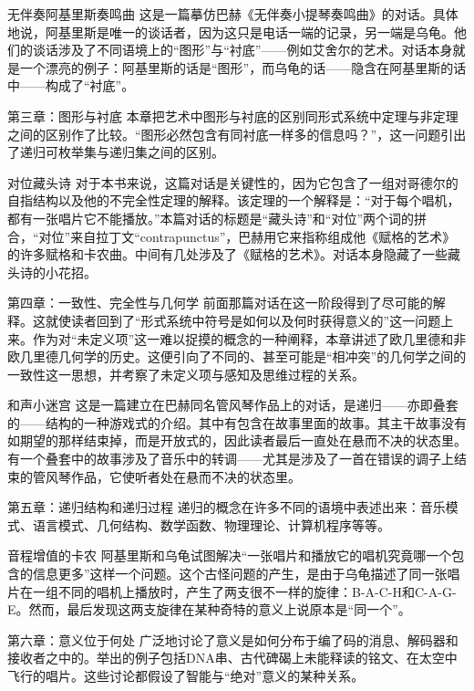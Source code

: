 \begin{overview}
\item[无伴奏阿基里斯奏鸣曲]这是一篇摹仿巴赫《无伴奏小提琴奏鸣曲》的对话。具体地说，阿基里斯是唯一的谈话者，因为这只是电话一端的记录，另一端是乌龟。他们的谈话涉及了不同语境上的“图形”与“衬底”——例如艾舍尔的艺术。对话本身就是一个漂亮的例子：阿基里斯的话是“图形”，而乌龟的话——隐含在阿基里斯的话中——构成了“衬底”。

\item[第三章：图形与衬底]本章把艺术中图形与衬底的区别同形式系统中定理与非定理之间的区别作了比较。“图形必然包含有同衬底一样多的信息吗？”，这一问题引出了递归可枚举集与递归集之间的区别。

\item[对位藏头诗]对于本书来说，这篇对话是关键性的，因为它包含了一组对哥德尔的自指结构以及他的不完全性定理的解释。该定理的一个解释是：“对于每个唱机，都有一张唱片它不能播放。”本篇对话的标题是“藏头诗”和“对位”两个词的拼合，“对位”来自拉丁文“contrapunctus”，巴赫用它来指称组成他《赋格的艺术》的许多赋格和卡农曲。中间有几处涉及了《赋格的艺术》。对话本身隐藏了一些藏头诗的小花招。

\item[第四章：一致性、完全性与几何学]前面那篇对话在这一阶段得到了尽可能的解释。这就使读者回到了“形式系统中符号是如何以及何时获得意义的”这一问题上来。作为对“未定义项”这一难以捉摸的概念的一种阐释，本章讲述了欧几里德和非欧几里德几何学的历史。这便引向了不同的、甚至可能是“相冲突”的几何学之间的一致性这一思想，并考察了未定义项与感知及思维过程的关系。

\item[和声小迷宫]这是一篇建立在巴赫同名管风琴作品上的对话，是递归——亦即叠套的——结构的一种游戏式的介绍。其中有包含在故事里面的故事。其主干故事没有如期望的那样结束掉，而是开放式的，因此读者最后一直处在悬而不决的状态里。有一个叠套中的故事涉及了音乐中的转调——尤其是涉及了一首在错误的调子上结束的管风琴作品，它使听者处在悬而不决的状态里。

\item[第五章：递归结构和递归过程]递归的概念在许多不同的语境中表述出来：音乐模式、语言模式、几何结构、数学函数、物理理论、计算机程序等等。

\item[音程增值的卡农]阿基里斯和乌龟试图解决“一张唱片和播放它的唱机究竟哪一个包含的信息更多”这样一个问题。这个古怪问题的产生，是由于乌龟描述了同一张唱片在一组不同的唱机上播放时，产生了两支很不一样的旋律：B-A-C-H和C-A-G-E。然而，最后发现这两支旋律在某种奇特的意义上说原本是“同一个”。

\item[第六章：意义位于何处]广泛地讨论了意义是如何分布于编了码的消息、解码器和接收者之中的。举出的例子包括DNA串、古代碑碣上未能释读的铭文、在太空中飞行的唱片。这些讨论都假设了智能与“绝对”意义的某种关系。


\end{overview}
